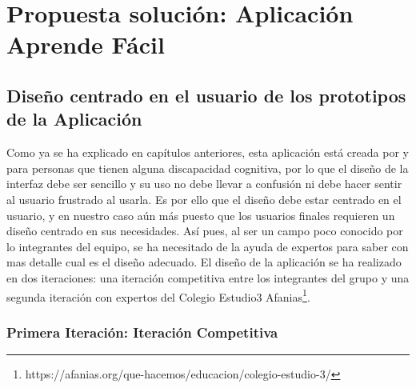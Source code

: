 \chapter{Propuesta solución: Aplicación Aprende Fácil}
\label{cap:aprendeFacil}



\section{Diseño centrado en el usuario de los prototipos de la Aplicación}
\label{cap:sec:disenioInterfaz}
Como ya se ha explicado en capítulos anteriores, esta aplicación está creada por y para personas que tienen alguna discapacidad cognitiva, por lo que el diseño de la interfaz debe ser sencillo y su uso no debe llevar a confusión ni debe hacer sentir al usuario frustrado al usarla. 
Es por ello que el diseño debe estar centrado en el usuario, y en nuestro caso aún más puesto que los usuarios finales requieren un diseño centrado en sus necesidades. Así pues, al ser un campo poco conocido por lo integrantes del equipo, se ha necesitado de la ayuda de expertos para saber con mas detalle cual es el diseño adecuado. 
El diseño de la aplicación se ha realizado en dos iteraciones: una iteración competitiva entre los integrantes del grupo y una segunda iteración con expertos del Colegio Estudio3 Afanias\footnote{https://afanias.org/que-hacemos/educacion/colegio-estudio-3/}. 

\subsection{Primera Iteración: Iteración Competitiva}
\label{cap:subsec:iteracionCompetitiva}


